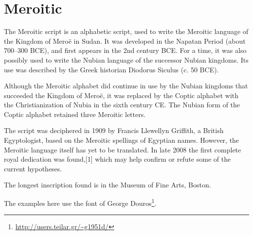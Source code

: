 \section{Meroitic}

The Meroitic script is an alphabetic script, used to write the Meroitic language of the Kingdom of Meroë in Sudan. It was developed in the Napatan Period (about 700–300 BCE), and first appears in the 2nd century BCE. For a time, it was also possibly used to write the Nubian language of the successor Nubian kingdoms. Its use was described by the Greek historian Diodorus Siculus (c. 50 BCE).

Although the Meroitic alphabet did continue in use by the Nubian kingdoms that succeeded the Kingdom of Meroë, it was replaced by the Coptic alphabet with the Christianization of Nubia in the sixth century CE. The Nubian form of the Coptic alphabet retained three Meroitic letters.

The script was deciphered in 1909 by Francis Llewellyn Griffith, a British Egyptologist, based on the Meroitic spellings of Egyptian names. However, the Meroitic language itself has yet to be translated. In late 2008 the first complete royal dedication was found,[1] which may help confirm or refute some of the current hypotheses.

The longest inscription found is in the Museum of Fine Arts, Boston.

\newfontfamily{}

\begin{scriptexample}[]{}
%
\end{scriptexample}

The examples here use the  font of George Douros\footnote{\url{http://users.teilar.gr/~g1951d/}}.